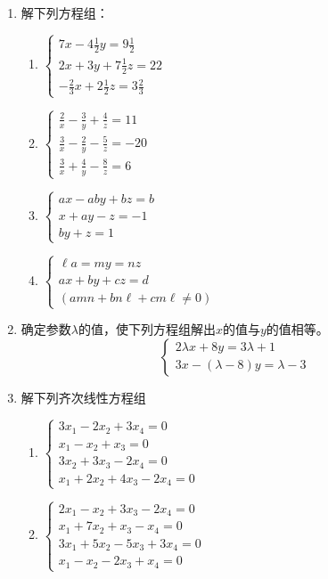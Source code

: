 \begin{enumerate}
\item 解下列方程组：
\begin{multicols}{2}
\begin{enumerate}
    \item $\begin{cases}
        7x-4\frac{1}{2}y=9\frac{1}{2}\\
        2x+3y+7\frac{1}{2}z=22\\
        -\frac{2}{3}x+2\frac{1}{2}z=3\frac{2}{3}
    \end{cases}$
    \item $\begin{cases}
        \frac{2}{x}-\frac{3}{y}+\frac{4}{z}=11\\
        \frac{3}{x}-\frac{2}{y}-\frac{5}{z}=-20\\
        \frac{3}{x}+\frac{4}{y}-\frac{8}{z}=6
    \end{cases}$
    \item $\begin{cases}
        ax-aby+bz=b\\
        x+ay-z=-1\\
        by+z=1
    \end{cases}$
    \item $\begin{cases}
        \ell a=my=nz\\
        ax+by+cz=d\\
        (amn+bn\ell+cm\ell\ne 0)
    \end{cases}$
\end{enumerate}
\end{multicols}

\item 确定参数$\lambda$的值，使下列方程组解出$x$的值与$y$的值相等。
\[\begin{cases}
    2\lambda  x+8y=3\lambda  +1 \\
    3x- (\lambda  -8) y=\lambda  -3
\end{cases}\]

\item 解下列齐次线性方程组
\begin{multicols}{2}
\begin{enumerate}
    \item $\begin{cases}
        3x_1-2x_2+3x_4=0\\
        x_1-x_2+x_3=0\\
        3x_2+3x_3-2x_4=0\\
        x_1+2x_2+4x_3-2x_4=0
    \end{cases}$
    \item $\begin{cases}
        2x_1-x_2+3x_3-2x_4=0\\
        x_1+7x_2+x_3-x_4=0\\
        3x_1+5x_2-5x_3+3x_4=0\\
        x_1-x_2-2x_3+x_4=0
    \end{cases}$
\end{enumerate}
\end{multicols}


\end{enumerate}
